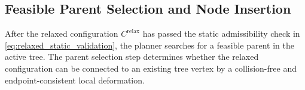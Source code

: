 \documentclass{pas}
\begin{document}


\subsection{Feasible Parent Selection and Node Insertion}
\label{subsec:gcr_parent_selection}

After the relaxed configuration \(C^{\mathrm{relax}}\) has passed the static
admissibility check in \ref{eq:relaxed_static_validation}, the planner searches
for a feasible parent in the active tree. The parent selection step determines
whether the relaxed configuration can be connected to an existing tree vertex by
a collision-free and endpoint-consistent local deformation.
\end{document}
